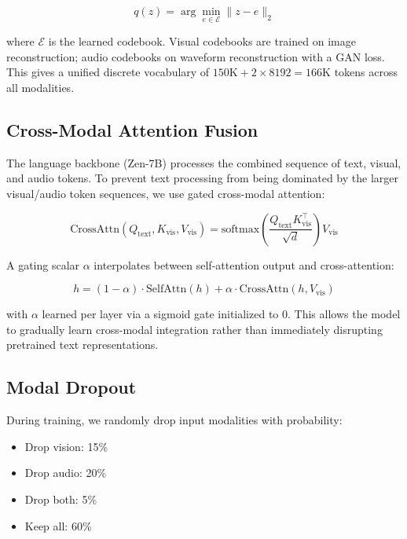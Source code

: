 \documentclass[11pt,a4paper]{article}
\begin{document}
\begin{equation}
q(z) = \arg\min_{e \in \mathcal{E}} \|z - e\|_2
\end{equation}

where $\mathcal{E}$ is the learned codebook. Visual codebooks are trained on
image reconstruction; audio codebooks on waveform reconstruction with a GAN loss.
This gives a unified discrete vocabulary of $150\text{K} + 2\times8192 = 166\text{K}$
tokens across all modalities.

\subsection{Cross-Modal Attention Fusion}

The language backbone (Zen-7B) processes the combined sequence of text, visual,
and audio tokens. To prevent text processing from being dominated by the larger
visual/audio token sequences, we use gated cross-modal attention:

\begin{equation}
\text{CrossAttn}(Q_\text{text}, K_\text{vis}, V_\text{vis}) = \text{softmax}\left(\frac{Q_\text{text} K_\text{vis}^\top}{\sqrt{d}}\right) V_\text{vis}
\end{equation}

A gating scalar $\alpha$ interpolates between self-attention output and cross-attention:

\begin{equation}
h = (1 - \alpha) \cdot \text{SelfAttn}(h) + \alpha \cdot \text{CrossAttn}(h, V_\text{vis})
\end{equation}

with $\alpha$ learned per layer via a sigmoid gate initialized to 0. This allows
the model to gradually learn cross-modal integration rather than immediately
disrupting pretrained text representations.

\subsection{Modal Dropout}

During training, we randomly drop input modalities with probability:
\begin{itemize}
  \item Drop vision: 15\%
  \item Drop audio: 20\%
  \item Drop both: 5\%
  \item Keep all: 60\%
\end{itemize}
\end{document}
